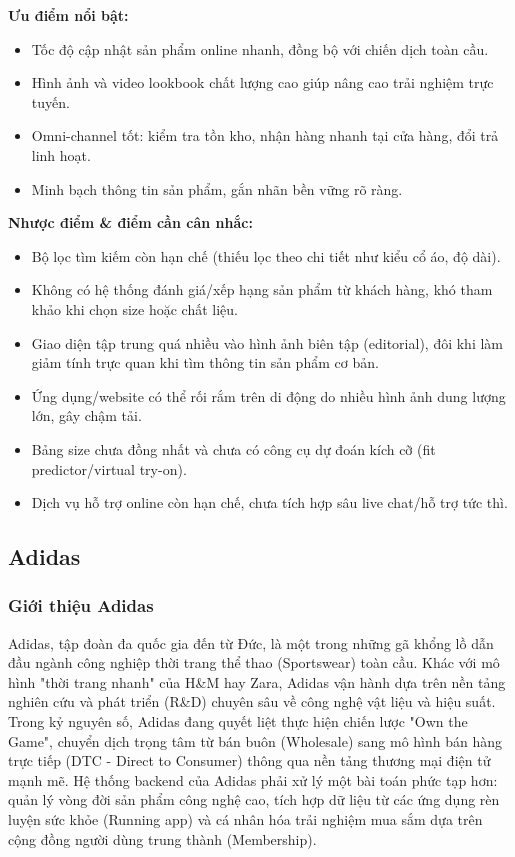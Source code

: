\textbf{Ưu điểm nổi bật:}
\begin{itemize}
  \item Tốc độ cập nhật sản phẩm online nhanh, đồng bộ với chiến dịch toàn cầu.
  \item Hình ảnh và video lookbook chất lượng cao giúp nâng cao trải nghiệm trực tuyến.
  \item Omni-channel tốt: kiểm tra tồn kho, nhận hàng nhanh tại cửa hàng, đổi trả linh hoạt.
  \item Minh bạch thông tin sản phẩm, gắn nhãn bền vững rõ ràng.
\end{itemize}

\textbf{Nhược điểm \& điểm cần cân nhắc:}
\begin{itemize}
  \item Bộ lọc tìm kiếm còn hạn chế (thiếu lọc theo chi tiết như kiểu cổ áo, độ dài).
  \item Không có hệ thống đánh giá/xếp hạng sản phẩm từ khách hàng, khó tham khảo khi chọn size hoặc chất liệu.
  \item Giao diện tập trung quá nhiều vào hình ảnh biên tập (editorial), đôi khi làm giảm tính trực quan khi tìm thông tin sản phẩm cơ bản.
  \item Ứng dụng/website có thể rối rắm trên di động do nhiều hình ảnh dung lượng lớn, gây chậm tải.
  \item Bảng size chưa đồng nhất và chưa có công cụ dự đoán kích cỡ (fit predictor/virtual try-on).
  \item Dịch vụ hỗ trợ online còn hạn chế, chưa tích hợp sâu live chat/hỗ trợ tức thì.
\end{itemize}
\subsection{Adidas}
\subsubsection{Giới thiệu Adidas}
Adidas, tập đoàn đa quốc gia đến từ Đức, là một trong những gã khổng lồ dẫn đầu ngành công nghiệp thời trang thể thao (Sportswear) toàn cầu. Khác với mô hình "thời trang nhanh" của H\&M hay Zara, Adidas vận hành dựa trên nền tảng nghiên cứu và phát triển (R\&D) chuyên sâu về công nghệ vật liệu và hiệu suất. Trong kỷ nguyên số, Adidas đang quyết liệt thực hiện chiến lược "Own the Game", chuyển dịch trọng tâm từ bán buôn (Wholesale) sang mô hình bán hàng trực tiếp (DTC - Direct to Consumer) thông qua nền tảng thương mại điện tử mạnh mẽ. Hệ thống backend của Adidas phải xử lý một bài toán phức tạp hơn: quản lý vòng đời sản phẩm công nghệ cao, tích hợp dữ liệu từ các ứng dụng rèn luyện sức khỏe (Running app) và cá nhân hóa trải nghiệm mua sắm dựa trên cộng đồng người dùng trung thành (Membership).

